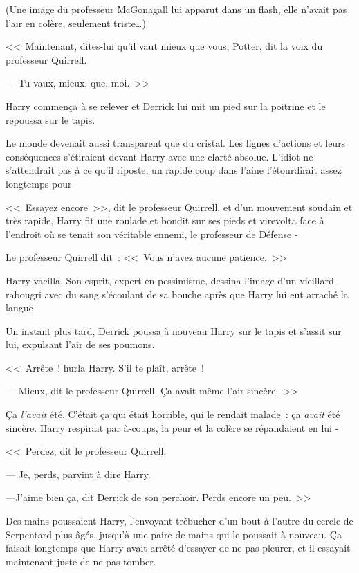 (Une image du professeur McGonagall lui apparut dans un flash, elle n'avait pas l'air en colère, seulement triste…)

<<~Maintenant, dites-lui qu'il vaut mieux que vous, Potter, dit la voix du professeur Quirrell.

--- Tu vaux, mieux, que, moi.~>>

Harry commença à se relever et Derrick lui mit un pied sur la poitrine et le repoussa sur le tapis.

Le monde devenait aussi transparent que du cristal. Les lignes d'actions et leurs conséquences s'étiraient devant Harry avec une clarté absolue. L'idiot ne s'attendrait pas à ce qu'il riposte, un rapide coup dans l'aine l'étourdirait assez longtemps pour -

<<~Essayez encore~>>, dit le professeur Quirrell, et d'un mouvement soudain et très rapide, Harry fit une roulade et bondit sur ses pieds et virevolta face à l'endroit où se tenait son véritable ennemi, le professeur de Défense -

Le professeur Quirrell dit~: <<~Vous n'avez aucune patience.~>>

Harry vacilla. Son esprit, expert en pessimisme, dessina l'image d'un vieillard rabougri avec du sang s'écoulant de sa bouche après que Harry lui eut arraché la langue -

Un instant plus tard, Derrick poussa à nouveau Harry sur le tapis et s'assit sur lui, expulsant l'air de ses poumons.

<<~Arrête~! hurla Harry. S'il te plaît, arrête~!

--- Mieux, dit le professeur Quirrell. Ça avait même l'air sincère.~>>

Ça \emph{l'avait} été. C'était ça qui était horrible, qui le rendait malade~: ça \emph{avait} été sincère. Harry respirait par à-coups, la peur et la colère se répandaient en lui -

<<~Perdez, dit le professeur Quirrell.

--- Je, perds, parvint à dire Harry.

---J'aime bien ça, dit Derrick de son perchoir. Perds encore un peu.~>>

\later

Des mains poussaient Harry, l'envoyant trébucher d'un bout à l'autre du cercle de Serpentard plus âgés, jusqu'à une paire de mains qui le poussait à nouveau. Ça faisait longtemps que Harry avait arrêté d'essayer de ne pas pleurer, et il essayait maintenant juste de ne pas tomber.

